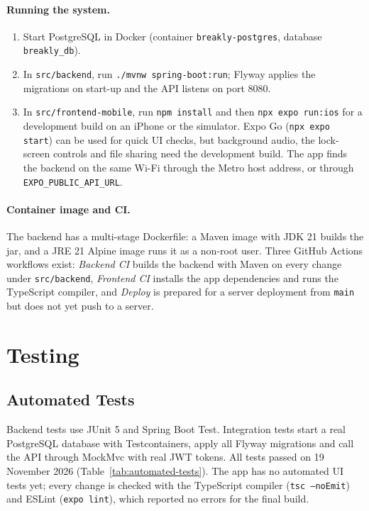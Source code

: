 \paragraph{Running the system.}
\begin{enumerate}[leftmargin=1.8em,itemsep=2pt]
  \item Start PostgreSQL in Docker (container \texttt{breakly-postgres},
        database \texttt{breakly\_db}).
  \item In \texttt{src/backend}, run \texttt{./mvnw spring-boot:run}; Flyway
        applies the migrations on start-up and the API listens on port 8080.
  \item In \texttt{src/frontend-mobile}, run \texttt{npm install} and then
        \texttt{npx expo run:ios} for a development build on an iPhone or the
        simulator. Expo Go (\texttt{npx expo start}) can be used for quick UI
        checks, but background audio, the lock-screen controls and file
        sharing need the development build. The app finds the backend on the
        same Wi-Fi through the Metro host address, or through
        \texttt{EXPO\_PUBLIC\_API\_URL}.
\end{enumerate}

\paragraph{Container image and CI.}
The backend has a multi-stage Dockerfile: a Maven image with JDK 21 builds the
jar, and a JRE 21 Alpine image runs it as a non-root user. Three GitHub
Actions workflows exist: \textit{Backend CI} builds the backend with Maven on
every change under \texttt{src/backend}, \textit{Frontend CI} installs the app
dependencies and runs the TypeScript compiler, and \textit{Deploy} is prepared
for a server deployment from \texttt{main} but does not yet push to a server.

\section{Testing}
\label{sec:testing}

\subsection{Automated Tests}
\label{sec:automated-tests}

Backend tests use JUnit 5 and Spring Boot Test. Integration tests start a real
PostgreSQL database with Testcontainers, apply all Flyway migrations and call
the API through MockMvc with real JWT tokens. All tests passed on 19 November
2026 (Table~\ref{tab:automated-tests}). The app has no automated UI tests yet;
every change is checked with the TypeScript compiler (\texttt{tsc --noEmit})
and ESLint (\texttt{expo lint}), which reported no errors for the final build.

